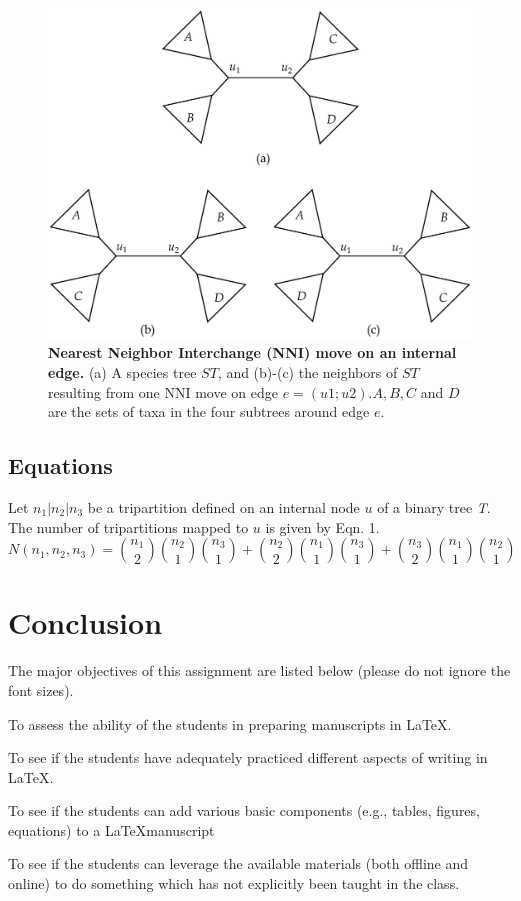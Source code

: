\documentclass[12pt,a4paper]{article}
\begin{document}
 \begin{figure}[h]
 	
	\centering
	\includegraphics[scale=0.25]{Figure3}
	\caption{\textbf{Nearest Neighbor Interchange (NNI) move on an internal edge.} (a)
		A species tree $ST$, and (b)-(c) the neighbors of $ST$ resulting from one NNI move on edge
		$e = (u1; u2). A, B, C$ and  $D$ are the sets of taxa in the four subtrees around edge $e$.}
	  \label{pic}
 \end{figure}
\subsection{Equations}
Let $n_1|n_2|n_3$ be a tripartition defined on an internal node $u$ of a binary tree \textit{T}. The
number of tripartitions mapped to $u$ is given by Eqn. 1.
\begin{equation}
 N (n_1,n_2,n_3) =\binom{n_1}{2}\binom{n_2}{1}\binom{n_3}{1}+ \binom{n_2}{2}\binom{n_1}{1}\binom{n_3}{1}+ \binom{n_3}{2}\binom{n_1}{1}\binom{n_2}{1}
\end{equation}
\section{Conclusion}
The major objectives of this assignment are listed below (please do not ignore the font
sizes).
	\begin{enumerate} 
		{\Large{\item To assess the ability of the students in preparing manuscripts
		in \LaTeX.}}
		{\large{\item To see if the students have adequately practiced different aspects of
				writing in \LaTeX.}}
		{\normalsize{\item To see if the students can add various basic components (e.g., tables, figures, equations) to a \LaTeX manuscript}}
	  {\small{\item To see if the students can leverage the available materials (both offline and online) to do
		something which has not explicitly been taught in the class.}}
	\end{enumerate}
	
\end{document}
